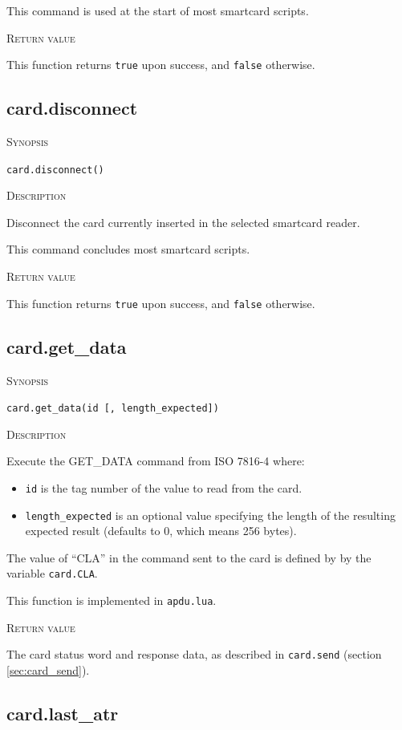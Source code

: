 \documentclass[11pt]{report}
\newcommand{\mansection}[1]{\vspace{0.5em}\par\noindent\textsc{#1}\vspace{0.5em}\par}
\newcommand{\syn}[1]{\texttt{#1}}
\begin{document}
  This command is used at the start of most smartcard scripts.

\mansection{Return value}
   This function returns \syn{true} upon success, and \syn{false} otherwise.


\subsection{card.disconnect}

\mansection{Synopsis}
\syn{card.disconnect()}

\mansection{Description}
  Disconnect the card currently inserted in the selected smartcard reader.
	  
  This command concludes most smartcard scripts.

\mansection{Return value}
  This function returns \syn{true} upon success, and \syn{false} otherwise.

\subsection{card.get\_data}

\mansection{Synopsis}
\syn{card.get\_data(id [, length\_expected])}


\mansection{Description}
  Execute the GET\_DATA command from ISO 7816-4 where:
  \begin{itemize}
  \item{\syn{id} is the tag number of the value to read from the card.}
  \item{\syn{length\_expected} is an optional value specifying the length of the resulting expected result (defaults to 0, which means 256 bytes).}
  \end{itemize}

  The value of ``CLA'' in the command sent to the card is defined by by the variable \syn{card.CLA}.

  This function is implemented in \syn{apdu.lua}.

\mansection{Return value}
  The card status word and response data, as described in \syn{card.send} (section \ref{sec:card_send}).


\subsection{card.last\_atr}
\end{document}
